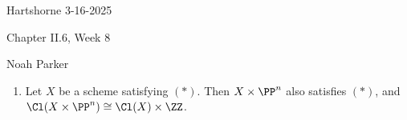 \documentclass[12pt]{amsart}
\begin{document}
{Hartshorne} \hfill {3-16-2025}

\bigskip\bigskip

\begin{center}

{\sc Chapter II.6, Week 8}

\end{center}

\begin{center}

  {Noah Parker} %
    
\end{center}

\bigskip\bigskip

\begin{enumerate}
  \item[6.1.] {
      Let $X$ be a scheme satisfying $(*)$.
      Then $X\times \PP^n$ also satisfies $(*)$, and $\Cl(X\times \PP^n)\cong \Cl(X)\times \ZZ$.
    }
\end{enumerate}
\end{document}
